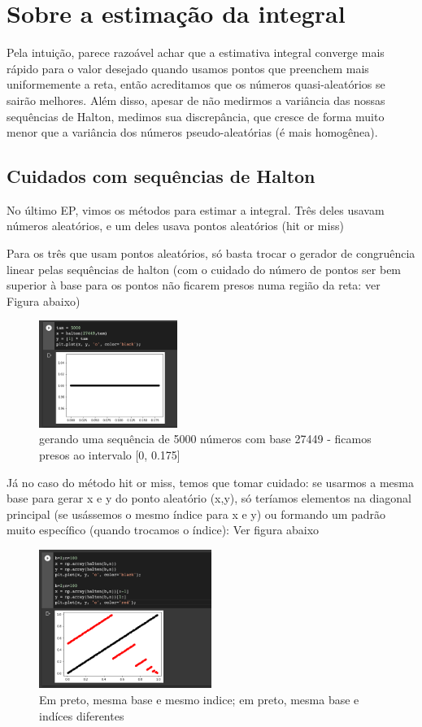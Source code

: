 \documentclass{article}
\begin{document}
\section{Sobre a estimação da integral}
Pela intuição, parece razoável achar que a estimativa integral converge mais rápido para o valor desejado quando usamos pontos que preenchem mais uniformemente a reta, então acreditamos que os números quasi-aleatórios se sairão melhores. Além disso, apesar de não medirmos a variância das nossas sequências de Halton, medimos sua discrepância, que cresce de forma muito menor que a variância dos números pseudo-aleatórias (é mais homogênea).

\subsection{Cuidados com sequências de Halton}
No último EP, vimos os métodos para estimar a integral. Três deles usavam números aleatórios, e um deles usava pontos aleatórios (hit or miss)

Para os três que usam pontos aleatórios, só basta trocar o gerador de congruência linear pelas sequências de halton (com o cuidado do número de pontos ser bem superior à base para os pontos não ficarem presos numa região da reta: ver Figura abaixo)

\begin{figure}[ht]
\centering
\includegraphics[width=0.4\textwidth]{falha_halton.png}
\caption{\label{fig:falha} gerando uma sequência de 5000 números com base 27449 - ficamos presos ao intervalo [0, 0.175]  }
\end{figure}

Já no caso do método hit or miss, temos que tomar cuidado: se usarmos a mesma base para gerar x e y do ponto aleatório (x,y), só teríamos elementos na diagonal principal (se usássemos o mesmo índice para x e y) ou formando um padrão muito específico (quando trocamos o índice): Ver figura abaixo

\begin{figure}[ht]
\centering
\includegraphics[width=0.5\textwidth]{falha2.png}
\caption{\label{fig:falha2} Em preto, mesma base e mesmo indice; em preto, mesma base e indíces diferentes  }
\end{figure}
\end{document}
